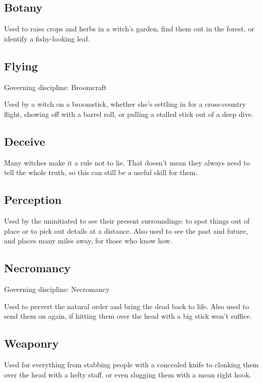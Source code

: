 \newcommand\govdisc[1]{Governing discipline: #1} %

\subsection{Botany}

Used to raise crops and herbs in a witch's garden, find them out in the forest, or identify a fishy-looking leaf.

\subsection{Flying}
\govdisc{Broomcraft}

Used by a witch on a broomstick, whether she's settling in for a cross-country flight, showing off with a barrel roll, or pulling a stalled stick out of a deep dive.

\subsection{Deceive}

Many witches make it a rule not to lie.
That doesn't mean they always need to tell the whole truth, so this can still be a useful skill for them.

\subsection{Perception}

Used by the uninitiated to see their present surroundings: to spot things out of place or to pick out details at a distance.
Also used to see the past and future, and places many miles away, for those who know how.

\subsection{Necromancy}
\govdisc{Necromancy}

Used to pervert the natural order and bring the dead back to life.
Also used to send them on again, if hitting them over the head with a big stick won't suffice.

\subsection{Weaponry}

Used for everything from stabbing people with a concealed knife to clonking them over the head with a hefty staff, or even slugging them with a mean right hook.
